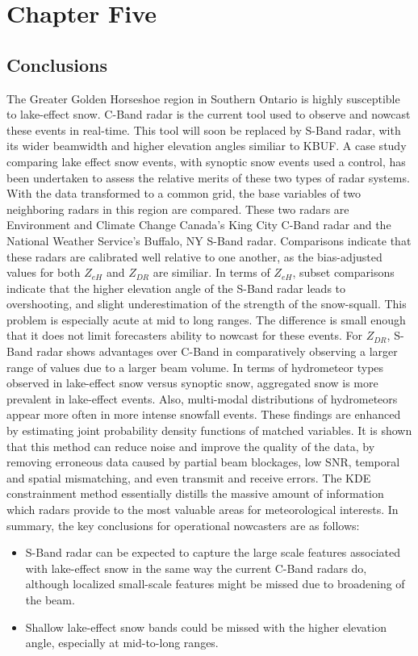 \chapter{Chapter Five}
\section{Conclusions}
The Greater Golden Horseshoe region in Southern Ontario is highly susceptible to lake-effect snow. C-Band radar is the current tool used to observe and nowcast
these events in real-time. This tool will soon be replaced by S-Band radar, with its wider beamwidth and higher elevation angles similiar to KBUF. A case study comparing lake
effect snow events, with synoptic snow events used a control, has been undertaken to assess the relative merits of these two types of radar systems. With the
data transformed to a common grid, the base variables of two neighboring radars in this region are compared. These two radars are Environment and Climate
Change Canada's King City C-Band radar and the National Weather Service's Buffalo, NY S-Band radar. Comparisons indicate that these radars are calibrated well relative to one another, as the bias-adjusted values for both $Z_{eH}$ and $Z_{DR}$ are similiar. In terms of $Z_{eH}$, subset comparisons indicate that the higher elevation angle of the S-Band radar leads to overshooting, and slight underestimation of the strength of the snow-squall.  This problem is especially 
acute at mid to long ranges. The difference is small enough that it does not limit forecasters ability to nowcast for these events. For $Z_{DR}$, S-Band radar shows advantages over C-Band in comparatively observing a larger range of values due to a larger beam volume. In terms of hydrometeor types observed in lake-effect snow versus synoptic snow, aggregated snow is more prevalent in lake-effect events. Also, multi-modal distributions of hydrometeors appear more often in more intense snowfall events. These findings are enhanced by estimating joint probability density functions of matched variables. It is shown that this method can reduce noise and improve 
the quality of the data, by removing erroneous data caused by partial beam blockages, low SNR, temporal and spatial mismatching, and even transmit and receive errors. The KDE constrainment method essentially distills the massive amount of information which radars provide to the most valuable areas for meteorological interests. In summary, the key conclusions for operational nowcasters are as follows:
\begin{itemize}
  \item S-Band radar can be expected to capture the large scale features associated with lake-effect snow in the same way the current C-Band radars do, although localized small-scale features might be missed due to broadening of the beam.
  \item Shallow lake-effect snow bands could be missed with the higher elevation angle, especially at mid-to-long ranges.
\end{itemize}